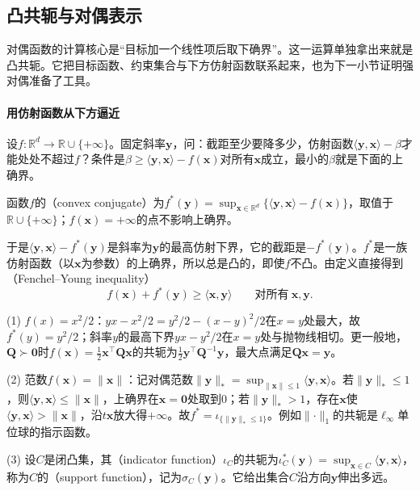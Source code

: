 \subsection{凸共轭与对偶表示}
\label{sec:opt-con-conjugate}

对偶函数的计算核心是“目标加一个线性项后取下确界”。这一运算单独拿出来就是凸共轭。它把目标函数、约束集合与下方仿射函数联系起来，也为下一小节证明强对偶准备了工具。

\paragraph{用仿射函数从下方逼近}
设$f:\mathbb R^d\to\mathbb R\cup\{+\infty\}$。固定斜率$\bm y$，问：截距至少要降多少，仿射函数$\langle\bm y,\bm x\rangle-\beta$才能处处不超过$f$？条件是$\beta\geq\langle\bm y,\bm x\rangle-f(\bm x)$对所有$\bm x$成立，最小的$\beta$就是下面的上确界。

\begin{definition}[凸共轭]
\label{def:opt-con-conjugate}
函数$f$的（convex conjugate）为$f^*(\bm y)=\sup_{\bm x\in\mathbb R^d}\{\langle\bm y,\bm x\rangle-f(\bm x)\}$，取值于$\mathbb R\cup\{+\infty\}$；$f(\bm x)=+\infty$的点不影响上确界。
\end{definition}

于是$\langle\bm y,\bm x\rangle-f^*(\bm y)$是斜率为$\bm y$的最高仿射下界，它的截距是$-f^*(\bm y)$。$f^*$是一族仿射函数（以$\bm x$为参数）的上确界，所以总是凸的，即使$f$不凸。由定义直接得到（Fenchel--Young inequality）
\begin{equation}
\label{eq:opt-con-fenchel-young}
  f(\bm x)+f^*(\bm y)\geq\langle\bm x,\bm y\rangle\qquad\text{对所有}\ \bm x,\bm y.
\end{equation}

\begin{example}[几个基本共轭]
\label{ex:opt-con-conjugates}
(1) $f(x)=x^2/2$：$yx-x^2/2=y^2/2-(x-y)^2/2$在$x=y$处最大，故$f^*(y)=y^2/2$；斜率$y$的最高下界$yx-y^2/2$在$x=y$处与抛物线相切。更一般地，$\bm Q\succ\bm0$时$f(\bm x)=\frac12\bm x^\top\bm Q\bm x$的共轭为$\frac12\bm y^\top\bm Q^{-1}\bm y$，最大点满足$\bm Q\bm x=\bm y$。

(2) 范数$f(\bm x)=\lVert\bm x\rVert$：记对偶范数$\lVert\bm y\rVert_*=\sup_{\lVert\bm x\rVert\leq1}\langle\bm y,\bm x\rangle$。若$\lVert\bm y\rVert_*\leq1$，则$\langle\bm y,\bm x\rangle\leq\lVert\bm x\rVert$，上确界在$\bm x=\bm0$处取到$0$；若$\lVert\bm y\rVert_*>1$，存在$\bm x$使$\langle\bm y,\bm x\rangle>\lVert\bm x\rVert$，沿$t\bm x$放大得$+\infty$。故$f^*=\iota_{\{\lVert\bm y\rVert_*\leq1\}}$。例如$\lVert\cdot\rVert_1$的共轭是$\ell_\infty$单位球的指示函数。

(3) 设$C$是闭凸集，其（indicator function）$\iota_C$的共轭为$\iota_C^*(\bm y)=\sup_{\bm x\in C}\langle\bm y,\bm x\rangle$，称为$C$的（support function），记为$\sigma_C(\bm y)$。它给出集合$C$沿方向$\bm y$伸出多远。
\end{example}

